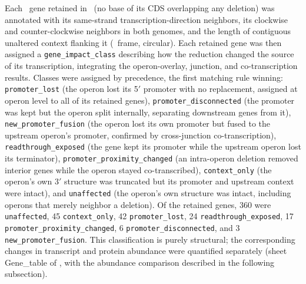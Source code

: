 Each \syn~gene retained in \syna~(no base of its CDS overlapping any deletion) was annotated with its same-strand transcription-direction neighbors, its clockwise and counter-clockwise neighbors in both genomes, and the length of contiguous unaltered context flanking it (\syn~frame, circular).
Each retained gene was then assigned a \texttt{gene\_impact\_class} describing how the reduction changed the source of its transcription, integrating the operon-overlay, junction, and co-transcription results.
Classes were assigned by precedence, the first matching rule winning: \texttt{promoter\_lost} (the operon lost its 5$'$ promoter with no replacement, assigned at operon level to all of its retained genes), \texttt{promoter\_disconnected} (the promoter was kept but the operon split internally, separating downstream genes from it), \texttt{new\_promoter\_fusion} (the operon lost its own promoter but fused to the upstream operon's promoter, confirmed by cross-junction co-transcription), \texttt{readthrough\_exposed} (the gene kept its promoter while the upstream operon lost its terminator), \texttt{promoter\_proximity\_changed} (an intra-operon deletion removed interior genes while the operon stayed co-transcribed), \texttt{context\_only} (the operon's own 3$'$ structure was truncated but its promoter and upstream context were intact), and \texttt{unaffected} (the operon's own structure was intact, including operons that merely neighbor a deletion).
Of the retained genes, 360 were \texttt{unaffected}, 45 \texttt{context\_only}, 42 \texttt{promoter\_lost}, 24 \texttt{readthrough\_exposed}, 17 \texttt{promoter\_proximity\_changed}, 6 \texttt{promoter\_disconnected}, and 3 \texttt{new\_promoter\_fusion}.
This classification is purely structural; the corresponding changes in transcript and protein abundance were quantified separately (sheet Gene\_table of \sdreduction, with the abundance comparison described in the following subsection).

